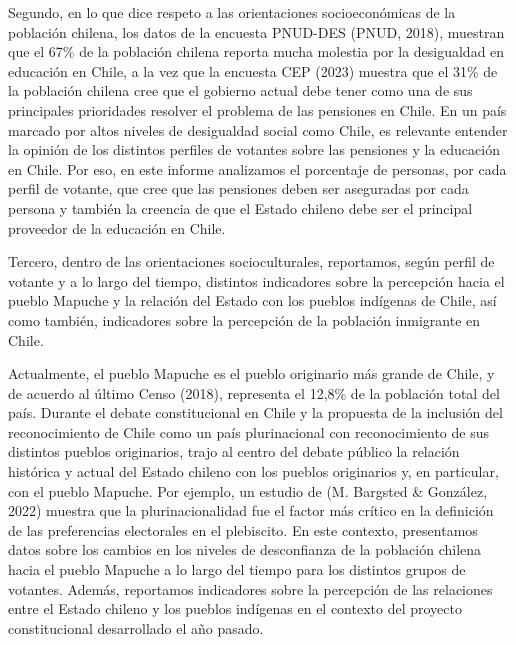 \documentclass[
  12pt,
]{book}
\begin{document}
Segundo, en lo que dice respeto a las orientaciones socioeconómicas de la población chilena, los datos de la encuesta PNUD-DES (PNUD, 2018), muestran que el 67\% de la población chilena reporta mucha molestia por la desigualdad en educación en Chile, a la vez que la encuesta CEP (2023) muestra que el 31\% de la población chilena cree que el gobierno actual debe tener como una de sus principales prioridades resolver el problema de las pensiones en Chile. En un país marcado por altos niveles de desigualdad social como Chile, es relevante entender la opinión de los distintos perfiles de votantes sobre las pensiones y la educación en Chile. Por eso, en este informe analizamos el porcentaje de personas, por cada perfil de votante, que cree que las pensiones deben ser aseguradas por cada persona y también la creencia de que el Estado chileno debe ser el principal proveedor de la educación en Chile.

Tercero, dentro de las orientaciones socioculturales, reportamos, según perfil de votante y a lo largo del tiempo, distintos indicadores sobre la percepción hacia el pueblo Mapuche y la relación del Estado con los pueblos indígenas de Chile, así como también, indicadores sobre la percepción de la población inmigrante en Chile.

Actualmente, el pueblo Mapuche es el pueblo originario más grande de Chile, y de acuerdo al último Censo (2018), representa el 12,8\% de la población total del país. Durante el debate constitucional en Chile y la propuesta de la inclusión del reconocimiento de Chile como un país plurinacional con reconocimiento de sus distintos pueblos originarios, trajo al centro del debate público la relación histórica y actual del Estado chileno con los pueblos originarios y, en particular, con el pueblo Mapuche. Por ejemplo, un estudio de (M. Bargsted \& González, 2022) muestra que la plurinacionalidad fue el factor más crítico en la definición de las preferencias electorales en el plebiscito. En este contexto, presentamos datos sobre los cambios en los niveles de desconfianza de la población chilena hacia el pueblo Mapuche a lo largo del tiempo para los distintos grupos de votantes. Además, reportamos indicadores sobre la percepción de las relaciones entre el Estado chileno y los pueblos indígenas en el contexto del proyecto constitucional desarrollado el año pasado.
\end{document}
